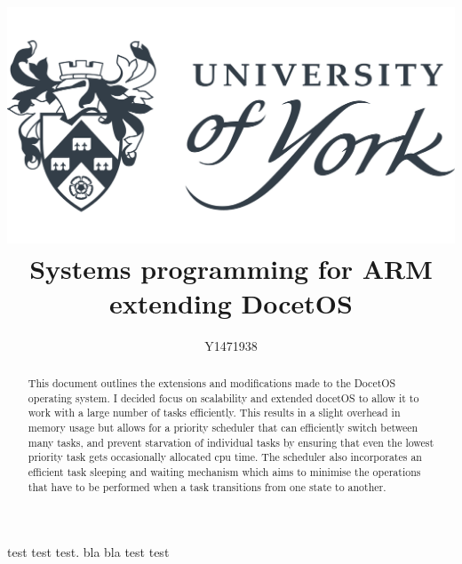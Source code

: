 \documentclass[12pt,a4paper]{article}
\author{Y1471938}
\title{
\includegraphics[width=\textwidth]{images/yorkUniLogo.png}\\
\textbf{Systems programming for ARM}\\ extending DocetOS}
\begin{document}
\maketitle
\begin{abstract}
This document outlines the extensions and modifications made to the DocetOS operating system. I decided focus on scalability and extended docetOS to allow it to work with a large number of tasks efficiently. This results in a slight overhead in memory usage but allows for a priority scheduler that can efficiently switch between many tasks, and prevent starvation of individual tasks by ensuring that even the lowest priority task gets occasionally allocated cpu time. The scheduler also incorporates an efficient task sleeping and waiting mechanism which aims to minimise the operations that have to be performed when a task transitions from one state to another. 
\end{abstract}
 test  test test. bla bla test test
\end{document}
